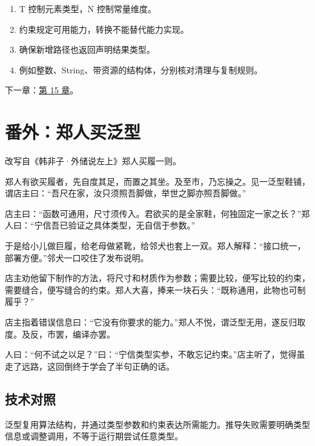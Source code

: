 \begin{enumerate}

\item T 控制元素类型，N 控制常量维度。

\item 约束规定可用能力，转换不能替代能力实现。

\item 确保新增路径也返回声明结果类型。

\item 例如整数、String、带资源的结构体，分别核对清理与复制规则。

\end{enumerate}

下一章：\hyperref[ch:15]{第 15 章}。

\section{番外：郑人买泛型}

改写自《韩非子·外储说左上》郑人买履一则。

郑人有欲买履者，先自度其足，而置之其坐。及至市，乃忘操之。见一泛型鞋铺，谓店主曰：“吾尺在家，汝只须照吾脚做，举世之脚亦照吾脚做。”

店主曰：“函数可通用，尺寸须传入。君欲买的是全家鞋，何独固定一家之长？”郑人曰：“宁信吾已验证之具体类型，无自信于参数。”

于是给小儿做巨履，给老母做紧靴，给邻犬也套上一双。郑人解释：“接口统一，部署方便。”邻犬一口咬住了发布说明。

店主劝他留下制作的方法，将尺寸和材质作为参数；需要比较，便写比较的约束，需要缝合，便写缝合的约束。郑人大喜，捧来一块石头：“既称通用，此物也可制履乎？”

店主指着错误信息曰：“它没有你要求的能力。”郑人不悦，谓泛型无用，遂反归取度。及反，市罢，编译亦罢。

人曰：“何不试之以足？”曰：“宁信类型实参，不敢忘记约束。”店主听了，觉得虽走了远路，这回倒终于学会了半句正确的话。

\subsection*{技术对照}

泛型复用算法结构，并通过类型参数和约束表达所需能力。推导失败需要明确类型信息或调整调用，不等于运行期尝试任意类型。
